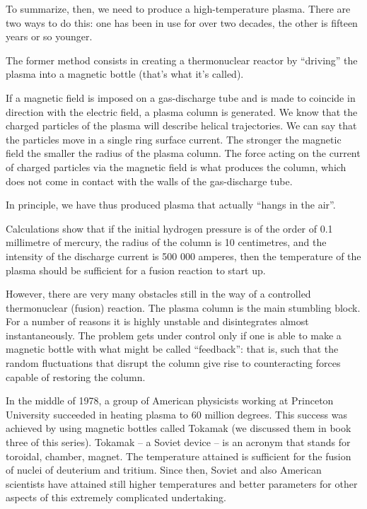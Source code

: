 To summarize, then, we need to produce a high-tem­perature plasma. There are two ways to do this: one has been in use for over two decades, the other is fifteen years or so younger.

The former method consists in creating a thermonu­clear reactor by ``driving'' the plasma into a magnetic bottle (that's what it's called).

If a magnetic field is imposed on a gas-discharge tube and is made to coincide in direction with the electric field, a plasma column is generated. We know that the charged particles of the plasma will describe helical tra­jectories. We can say that the particles move in a single ring surface current. The stronger the magnetic field the smaller the radius of the plasma column. The force acting on the current of charged particles via the magnetic field is what produces the column, which does not come in contact with the walls of the gas-discharge tube.

In principle, we have thus produced plasma that actu­ally ``hangs in the air''.

Calculations show that if the initial hydrogen pressure is of the order of 0.1 millimetre of mercury, the radius of the column is 10 centimetres, and the intensity of the discharge current is 500 000 amperes, then the temperature of the plasma should be sufficient for a fusion reac­tion to start up.

However, there are very many obstacles still in the way of a controlled thermonuclear (fusion) reaction. The plasma column is the main stumbling block. For a num­ber of reasons it is highly unstable and disintegrates almost instantaneously. The problem gets under control only if one is able to make a magnetic bottle with what might be called ``feedback'': that is, such that the random fluctuations that disrupt the column give rise to counteracting forces capable of restoring the column.

In the middle of 1978, a group of American physicists working at Princeton University succeeded in heating plasma to 60 million degrees. This success was achieved by using magnetic bottles called Tokamak (we discussed them in book three of this series). Tokamak -- a Soviet device -- is an acronym that stands for toroidal, chamber, magnet. The temperature attained is sufficient for the fusion of nuclei of deuterium and tritium. Since then, Soviet and also American scientists have attained still higher temperatures and better parameters for other as­pects of this extremely complicated undertaking.

